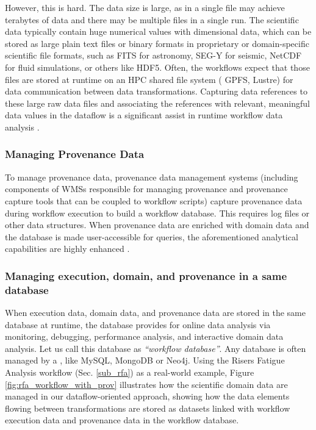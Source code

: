 However, this is hard. The data size is large, as in a single file may achieve terabytes of data and there may be multiple files in a single run. The scientific data typically contain huge numerical values with dimensional data, which can be stored as large plain text files or binary formats in proprietary or domain-specific scientific file formats, such as FITS for astronomy, SEG-Y for seismic,
NetCDF for fluid simulations, or others like
HDF5.
Often, the workflows expect that those files are
stored at runtime on an HPC shared file system (\eg{} GPFS,
Lustre) for data communication between data transformations.
Capturing data references to
these large raw data files and associating the references with relevant, meaningful data values in the dataflow is a significant assist in runtime workflow data analysis
\cite{Silva2017Raw}.

\subsubsection{Managing Provenance Data}

To manage provenance data, provenance data management systems (including components of WMSs responsible for managing provenance and provenance capture tools that can be coupled to workflow scripts) capture provenance
data during workflow execution to build a workflow database.
This requires log files or other data structures. When provenance data are enriched with domain data and the
database is made user-accessible for queries, the aforementioned
analytical capabilities are highly enhanced
\cite{Ogasawara2011algebraic,Souza2015Parallel,Silva2017Raw,DeOliveira2015How}.

\subsubsection{Managing execution, domain, and provenance in a same database}
\label{subsec_wfdb}

When execution data, domain data, and provenance data are stored in the
same database at runtime, the database provides for online data analysis via monitoring, debugging, performance analysis, and interactive domain data analysis. Let us call this database as \textit{``workflow database''}. Any database is often managed
by a , like MySQL, MongoDB or Neo4j. Using the Risers Fatigue Analysis workflow (Sec. \ref{sub_rfa}) as a real-world example, Figure \ref{fig:rfa_workflow_with_prov}  illustrates how the scientific domain data are managed in our dataflow-oriented approach, showing how the data elements flowing between transformations are stored as datasets linked with workflow execution data and provenance data in the workflow database.

